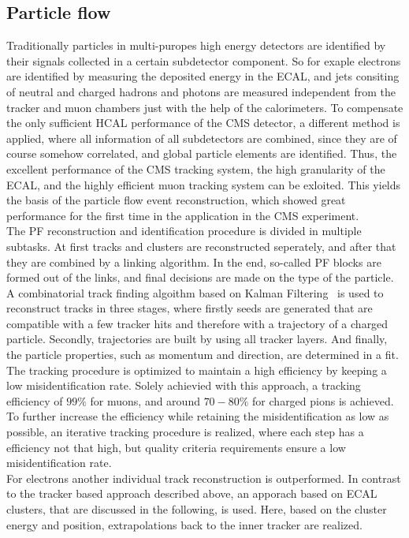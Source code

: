 \subsection{Particle flow}
Traditionally particles in multi-puropes high energy detectors are identified by their signals collected in a certain subdetector component. So for exaple electrons are identified by measuring the deposited energy in the ECAL, and jets consiting of neutral and charged hadrons and photons are measured independent from the tracker and muon chambers just with the help of the calorimeters. To compensate the only sufficient HCAL performance of the CMS detector, a different method is applied, where all information of all subdetectors are combined, since they are of course somehow correlated, and global particle elements are identified. Thus, the excellent performance of the CMS tracking system, the high granularity of the ECAL, and the highly efficient muon tracking system can be exloited. This yields the basis of the particle flow event reconstruction, which showed great performance for the first time in the application in the CMS experiment.\\
The PF reconstruction and identification procedure is divided in multiple subtasks. At first tracks and clusters are reconstructed seperately, and after that they are combined by a linking algorithm. In the end, so-called PF blocks are formed out of the links, and final decisions are made on the type of the particle.\\
A combinatorial track finding algoithm based on Kalman Filtering~\cite{Kalman} is used to reconstruct tracks in three stages, where firstly seeds are generated that are compatible with a few tracker hits and therefore with a trajectory of a charged particle. Secondly, trajectories are built by using all tracker layers. And finally, the particle properties, such as momentum and direction, are determined in a fit. The tracking procedure is optimized to maintain a high efficiency by keeping a low misidentification rate. Solely achievied with this approach, \eg a tracking efficiency of $99\%$ for muons, and around $70-80\%$ for charged pions is achieved. To further increase the efficiency while retaining the misidentification as low as possible, an iterative tracking procedure is realized, where each step has a efficiency not that high, but quality criteria requirements ensure a low misidentification rate.\\
For electrons another individual track reconstruction is outperformed. In contrast to the tracker based approach described above, an apporach based on ECAL clusters, that are discussed in the following, is used. Here, based on the cluster energy and position, extrapolations back to the inner tracker are realized.\\
